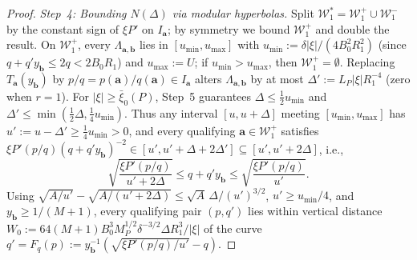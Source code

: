 \documentclass[11pt]{article}
\begin{document}
\begin{proof}
\emph{Step~4: Bounding $N(\Delta)$ via modular hyperbolas.}
Split $\mathcal{W}_1^*=\mathcal{W}_1^+\cup\mathcal{W}_1^-$ by the constant sign of $\xi P'$ on $I_{\mathbf{a}}$; by symmetry we bound $\mathcal{W}_1^+$ and double the result. On $\mathcal{W}_1^+$, every $\Lambda_{\mathbf{a},\mathbf{b}}$ lies in $[u_{\min},u_{\max}]$ with $u_{\min}:=\delta|\xi|/(4B_0^2R_1^2)$ (since $q+q'y_{\mathbf{b}}\le 2q<2B_0R_1$) and $u_{\max}:=U$; if $u_{\min}>u_{\max}$, then $\mathcal{W}_1^+=\emptyset$. Replacing $T_{\mathbf{a}}(y_{\mathbf{b}})$ by $p/q=p(\mathbf{a})/q(\mathbf{a})\in I_{\mathbf{a}}$ alters $\Lambda_{\mathbf{a},\mathbf{b}}$ by at most $\Delta':=L_P|\xi|R_1^{-4}$ (zero when $r=1$). For $|\xi|\ge\bar\xi_0(P)$, Step~5 guarantees $\Delta\le\frac12 u_{\min}$ and $\Delta'\le\min(\frac12\Delta,\frac14 u_{\min})$. Thus any interval $[u,u+\Delta]$ meeting $[u_{\min},u_{\max}]$ has $u':=u-\Delta'\ge\frac14 u_{\min}>0$, and every qualifying $\mathbf{a}\in\mathcal{W}_1^+$ satisfies $\xi P'(p/q)(q+q'y_{\mathbf{b}})^{-2}\in[u',u'+\Delta+2\Delta']\subseteq[u',u'+2\Delta]$, i.e.,
\[
\sqrt{\frac{\xi P'(p/q)}{u'+2\Delta}}\le q+q'y_{\mathbf{b}}\le\sqrt{\frac{\xi P'(p/q)}{u'}}.
\]
Using $\sqrt{A/u'}-\sqrt{A/(u'+2\Delta)}\le\sqrt{A}\,\Delta/(u')^{3/2}$, $u'\ge u_{\min}/4$, and $y_{\mathbf{b}}\ge1/(M+1)$, every qualifying pair $(p,q')$ lies within vertical distance $W_0:=64(M+1)B_0^3M_P^{1/2}\delta^{-3/2}\Delta R_1^3/|\xi|$ of the curve $q'=F_q(p):=y_{\mathbf{b}}^{-1}(\sqrt{\xi P'(p/q)/u'}-q)$.


\end{proof}
\end{document}
